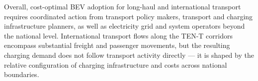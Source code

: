 Overall, cost-optimal \ac{BEV} adoption for long-haul and international transport requires coordinated action from transport policy makers, transport and charging infrastructure planners, as well as electricity grid and system operators beyond the national level. International transport flows along the TEN-T corridors encompass substantial freight and passenger movements, but the resulting charging demand does not follow transport activity directly — it is shaped by the relative configuration of charging infrastructure and costs across national boundaries.


    
    



